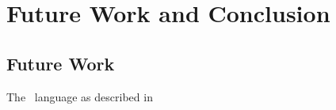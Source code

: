 \chapter{Future Work and Conclusion}
\section{Future Work}
The \MiniML\ language as described in \label{chap:FormalizationOfAdvancedConcepts}